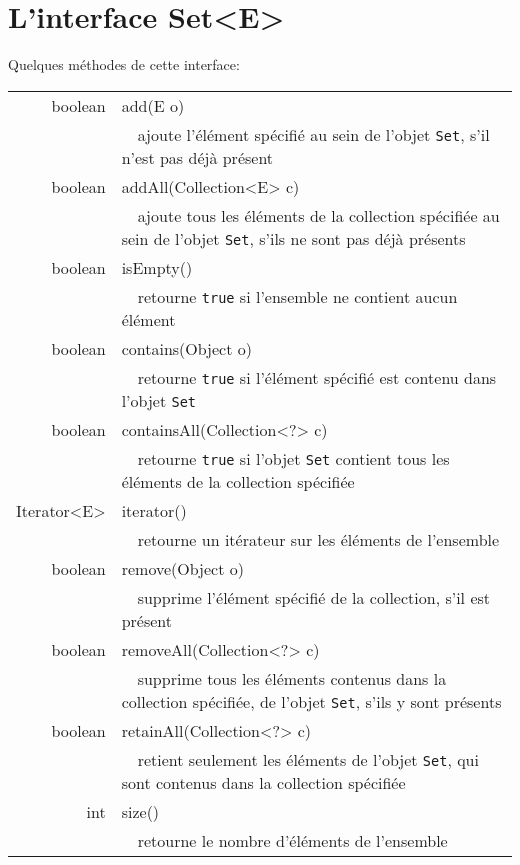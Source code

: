\documentclass[iutinfo,a4paper,nocorrections,10pt]{ustl-tdtp}
\date{\annee{2018}--\annee{2019}}
\begin{document}
\maketitle
\thispagestyle{empty}


\section{L'interface Set<E>}

Quelques méthodes de cette interface:

\begin{center}
\begin{tabular}{|r|l|}
\hline
boolean & add(E o)\\
&~~ajoute l'élément spécifié au sein de l'objet \texttt{Set}, s'il n'est pas déjà présent\\

\hline
boolean & addAll(Collection<E> c)\\
&~~ajoute tous les éléments de la collection spécifiée au sein de l'objet \texttt{Set}, s'ils ne sont pas déjà présents\\

\hline
  boolean & isEmpty()\\
&~~retourne \texttt{true} si l'ensemble ne contient aucun élément\\

 \hline
 boolean & contains(Object o)\\
&~~retourne \texttt{true} si l'élément spécifié est contenu dans l'objet \texttt{Set}\\

\hline
 boolean & containsAll(Collection<?> c)\\
&~~retourne \texttt{true} si l'objet \texttt{Set} contient tous les éléments de la collection spécifiée\\

\hline
 Iterator<E> & iterator()\\
&~~retourne un itérateur sur les éléments de l'ensemble\\
\hline
 boolean & remove(Object o)\\
&~~supprime l'élément spécifié de la collection, s'il est présent\\

\hline
 boolean & removeAll(Collection<?> c)\\
&~~supprime tous les éléments contenus dans la collection spécifiée, de l'objet \texttt{Set}, s'ils y sont présents\\
\hline
 boolean & retainAll(Collection<?> c)\\
&~~retient seulement les éléments de l'objet \texttt{Set}, qui sont contenus dans la collection spécifiée\\
\hline
 int & size()\\
&~~retourne le nombre d'éléments de l'ensemble\\

\hline
\end{tabular}
\end{center}
\end{document}
